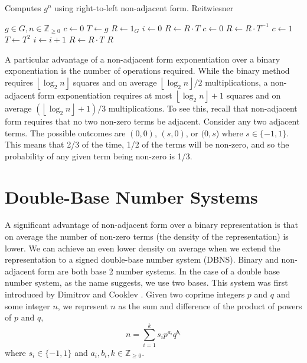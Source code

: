 \documentclass{ucalgthes1}
\theoremstyle{plain}
\theoremstyle{definition}
\newcommand{\ZZgez}{\mathbb{Z}_{\ge 0}}
\newcommand{\floor}[1]{\left\lfloor #1 \right\rfloor}
\begin{document}
\begin{algorithm}[h]
\caption{Computes $g^n$ using right-to-left non-adjacent form. Reitwiesner \cite{reitwiesner1960}}
\label{alg:nafR2LImmutable}
\begin{algorithmic}[1]
\REQUIRE $g \in G, n \in \ZZgez$
\STATE $c \gets 0$ 
\STATE $T \gets g$ 
\STATE $R \gets 1_G$
\STATE $i \gets 0$
	\IF {$\floor{n/2^i}+c \equiv 1 \pmod 4$}
		\STATE $R \gets R \cdot T$
		\STATE $c \gets 0$
	\ELSIF {$\floor{n/2^i}+c \equiv 3 \pmod 4$}
		\STATE $R \gets R \cdot T^{-1}$
		\STATE $c \gets 1$
	\ENDIF
	\STATE $T \gets T^2$
	\STATE $i \gets i+1$
\ENDWHILE
{} \STATE $R \gets R \cdot T$ \ENDIF
\RETURN $R$
\end{algorithmic}
\end{algorithm}

A particular advantage of a non-adjacent form exponentiation over a binary exponentiation is the number of operations required.  While the binary method requires $\floor{\log_2 n}$ squares and on average $\floor{\log_2 n}/2$ multiplications, a non-adjacent form exponentiation requires at most $\floor{\log_2 n}+1$ squares and on average $(\floor{\log_2 n}+1)/3$ multiplications.  To see this, recall that non-adjacent form requires that no two non-zero terms be adjacent.  Consider any two adjacent terms.  The possible outcomes are $(0,0)$, $(s, 0)$, or $(0, s$) where $s \in \{-1, 1\}$. This means that 2/3 of the time, 1/2 of the terms will be non-zero, and so the probability of any given term being non-zero is 1/3.


\bigbreak
\section{Double-Base Number Systems}\label{section:dbns}

A significant advantage of non-adjacent form over a binary representation is that on average the number of non-zero terms (the density of the representation) is lower.  We can achieve an even lower density on average when we extend the representation to a signed double-base number system (DBNS).  Binary and non-adjacent form are both base 2 number systems.  In the case of a double base number system, as the name suggests, we use two bases.  This system was first introduced by Dimitrov and Cooklev \cite{Dimitrov1995a, Dimitrov1995b}.  Given two coprime integers $p$ and $q$ and some integer $n$, we represent $n$ as the sum and difference of the product of powers of $p$ and $q$,
\begin{equation}\label{eq:generalDbnsForm}
	n = \sum_{i=1}^k s_i p^{a_i} q^{b_i}
\end{equation}
where $s_i \in \{-1, 1\}$ and $a_i, b_i, k \in \ZZgez$.
\end{document}
